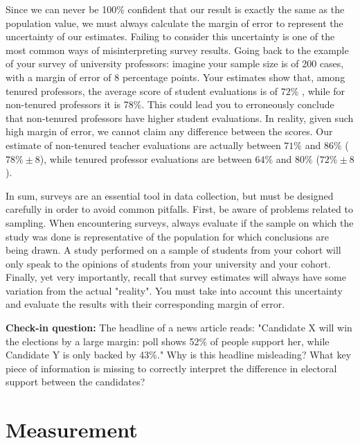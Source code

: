 \documentclass{book}
\newenvironment{shaded*}{
    \begin{center}
    \begin{tabular}{|p{0.9\textwidth}|}
    \hline\\
    }
    { 
    \\\\\hline
    \end{tabular} 
    \end{center}
}
\begin{document}
Since we can never be 100\% confident that our result is exactly the same as
the population value, we must always calculate the margin of error to
represent the uncertainty of our estimates. Failing to consider this
uncertainty is one of the most common ways of misinterpreting survey results.
Going back to the example of your survey of university professors: imagine
your sample size is of 200 cases, with a margin of error of 8 percentage
points. Your estimates show that, among tenured professors, the average score
of student evaluations is of \(72\%\) , while for non-tenured professors it is
78\%. This could lead you to erroneously conclude that non-tenured professors
have higher student evaluations. In reality, given such high margin of error,
we cannot claim any difference between the scores. Our estimate of non-tenured
teacher evaluations are actually between \(71\%\) and \(86\%\)
(\(78\% \pm 8\)), while tenured professor evaluations are between \(64\%\) and
\(80\%\) (\(72\% \pm 8\)).

In sum, surveys are an essential tool in data collection, but must be designed
carefully in order to avoid common pitfalls. First, be aware of problems
related to sampling. When encountering surveys, always evaluate if the sample
on which the study was done is representative of the population for which
conclusions are being drawn. A study performed on a sample of students from
your cohort will only speak to the opinions of students from your university
and your cohort. Finally, yet very importantly, recall that survey estimates
will always have some variation from the actual "reality". You must take into
account this uncertainty and evaluate the results with their corresponding
margin of error.

\begin{shaded*}

\textbf{Check-in question:} The headline of a news article reads: "Candidate X
will win the elections by a large margin: poll shows 52\% of people support
her, while Candidate Y is only backed by 43\%." Why is this headline
misleading? What key piece of information is missing to correctly interpret
the difference in electoral support between the candidates?

\end{shaded*}

\hypertarget{measurement}{%
\section{Measurement}\label{measurement}}
\end{document}

